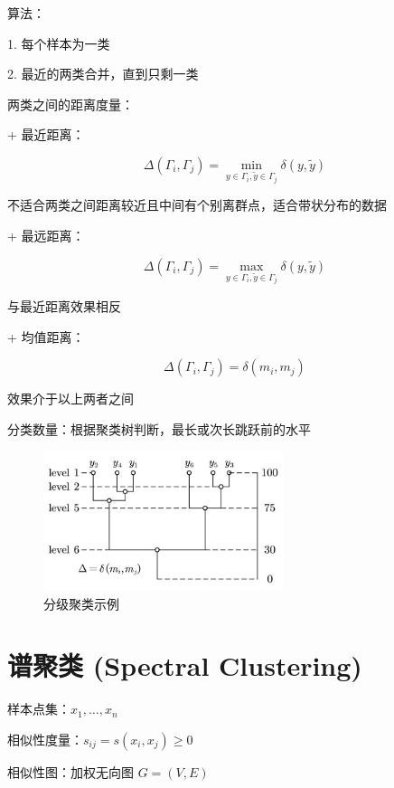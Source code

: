 \documentclass[openany]{ctexbook}
\theoremstyle{kaiti}
\theoremstyle{normal}
\begin{document}
算法：

1. 每个样本为一类

2. 最近的两类合并，直到只剩一类

两类之间的距离度量：

+ 最近距离：

  \begin{equation}
  \Delta \left(\Gamma_i,\Gamma_j \right)=\min_{y\in \Gamma_i, \tilde{y}\in \Gamma_j}\delta \left(y,\tilde{y} \right)
  \end{equation}

  不适合两类之间距离较近且中间有个别离群点，适合带状分布的数据

+ 最远距离：

  \begin{equation}
  \Delta \left(\Gamma_i,\Gamma_j \right)=\max_{y\in \Gamma_i, \tilde{y}\in \Gamma_j}\delta \left(y,\tilde{y} \right)
  \end{equation}

  与最近距离效果相反

+ 均值距离：

  \begin{equation}
  \Delta \left(\Gamma_i,\Gamma_j \right)=\delta \left(m_i,m_j \right)
  \end{equation}

  效果介于以上两者之间

分类数量：根据聚类树判断，最长或次长跳跃前的水平

\begin{figure}
  \centering
  \includegraphics[width=7cm]{1627808686180-10.2.jpg}
  \caption{分级聚类示例}
\end{figure}

\section{谱聚类 (Spectral Clustering) }

样本点集：$x_1,\dots ,x_n$

相似性度量：$s_{ij}=s\left(x_i,x_j \right)\geqslant 0$

相似性图：加权无向图 $G=\left(V,E \right)$
\end{document}
